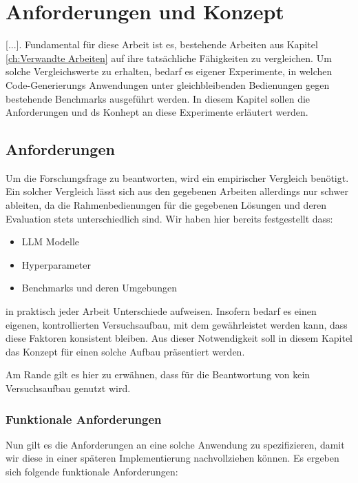 \chapter{Anforderungen und Konzept}\label{ch:Anforderungen und Konzept}

[...]. Fundamental für diese Arbeit ist es, bestehende Arbeiten aus Kapitel \ref{ch:Verwandte Arbeiten} auf ihre tatsächliche Fähigkeiten zu vergleichen. Um solche Vergleichswerte zu erhalten, bedarf es eigener Experimente, in welchen Code-Generierungs Anwendungen unter gleichbleibenden Bedienungen gegen bestehende Benchmarks ausgeführt werden. In diesem Kapitel sollen die Anforderungen und ds Konhept an diese Experimente erläutert werden.

\section{Anforderungen}\label{ch:Anforderungen}

Um die Forschungsfrage  zu beantworten, wird ein empirischer Vergleich benötigt. Ein solcher Vergleich lässt sich aus den gegebenen Arbeiten allerdings nur schwer ableiten, da die Rahmenbedienungen für die gegebenen Lösungen und deren Evaluation stets unterschiedlich sind. Wir haben hier bereits festgestellt dass:

\begin{itemize}
    \item LLM Modelle
    \item Hyperparameter
    \item Benchmarks und deren Umgebungen
\end{itemize}

in praktisch jeder Arbeit Unterschiede aufweisen. Insofern bedarf es einen eigenen, kontrollierten Versuchsaufbau, mit dem gewährleistet werden kann, dass diese Faktoren konsistent bleiben. Aus dieser Notwendigkeit soll in diesem Kapitel das Konzept für einen solche Aufbau präsentiert werden.

Am Rande gilt es hier zu erwähnen, dass für die Beantwortung von  kein Versuchsaufbau genutzt wird.

\subsection{Funktionale Anforderungen}\label{ch:Funktionale Anforderungen}

Nun gilt es die Anforderungen an eine solche Anwendung zu spezifizieren, damit wir diese in einer späteren Implementierung nachvollziehen können. Es ergeben sich folgende funktionale Anforderungen:

